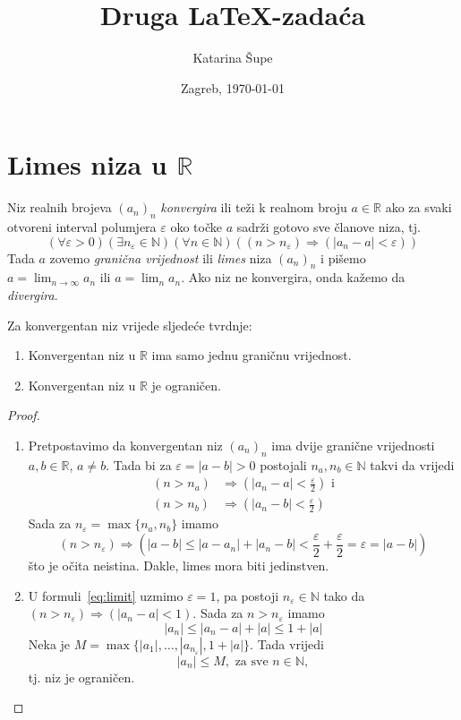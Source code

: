 \documentclass[10pt]{scrartcl}
\begin{document}
\title{Druga \LaTeX-zadaća}
\author{Katarina Šupe}
\date{Zagreb, \today}
\maketitle
\tableofcontents
\section{Limes niza u \texorpdfstring{$\mathbb R$}{R}}
\begin{definicija}\label{tm:convergence}
Niz realnih brojeva $(a_n)_n$ \emph{konvergira} ili teži k realnom broju $a \in \mathbb R$ ako za svaki otvoreni interval polumjera $\varepsilon$ oko točke $a$ sadrži gotovo sve članove niza, tj.
\begin{equation}\label{eq:limit}
    (\forall \varepsilon > 0)(\exists n_{\varepsilon} \in \mathbb N)(\forall n \in \mathbb N) \left( ( n > n_{\varepsilon} ) \Rightarrow (|a_n -a| < \varepsilon ) \right) \tag{\Coffeecup}
\end{equation}
Tada $a$ zovemo \emph{granična vrijednost} ili \emph{limes} niza $(a_n)_n$ i pišemo $a = \lim_{n \to \infty} a_n$ ili $a = \lim_n a_n$. Ako niz ne konvergira, onda kažemo da \emph{divergira}.
\end{definicija}
\begin{teorem} 
Za konvergentan niz vrijede sljedeće tvrdnje:
\begin{enumerate}
    \item Konvergentan niz u $\mathbb R$ ima samo jednu graničnu vrijednost.
    \item Konvergentan niz u $\mathbb R$ je ograničen.
\end{enumerate}
\end{teorem}
\begin{proof}
\begin{enumerate}
\item Pretpostavimo da konvergentan niz $(a_n)_n$ ima dvije granične vrije\-dno\-sti $a,b \in \mathbb R$, $a \neq b$. Tada bi za $\varepsilon = |a-b|>0$ postojali $n_a,n_b \in \mathbb N$ takvi da vrijedi
\begin{align*}
(n>n_a) &\Rightarrow \left(|a_n - a| < \frac{\varepsilon}{2} \right) \text{ i}\\
(n>n_b) &\Rightarrow \left(|a_n - b| < \frac{\varepsilon}{2} \right)
\end{align*}
Sada za $n_{\varepsilon} = \max\{n_a, n_b\}$ imamo
\[
(n>n_\varepsilon) \Rightarrow \left(|a-b| \leq |a-a_n| + |a_n - b| < \frac{\varepsilon}{2} + \frac{\varepsilon}{2} = \varepsilon = |a-b| \right)
\]
što je očita neistina. Dakle, limes mora biti jedinstven. 
\item U formuli~\eqref{eq:limit} uzmimo $\varepsilon = 1$, pa postoji $n_{\varepsilon} \in \mathbb N$ tako da $(n>n_{\varepsilon}) \Rightarrow (|a_n - a| <1)$. Sada za $n>n_{\varepsilon}$ imamo 
\[
|a_n| \leq |a_n - a| + |a| \leq 1 + |a|
\]
Neka je $M = \max\{|a_1|,\dotsc, |a_{n_{\varepsilon}}|, 1 + |a| \}$. Tada vrijedi 
\[
|a_n|\leq M,\text{ za sve } n \in \mathbb N,
\]
tj. niz je ograničen.
\end{enumerate}
\end{proof}
%
\end{document}
